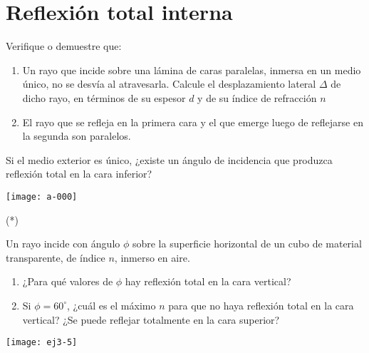 \section*{Reflexión total interna}

\item Verifique o demuestre que:\\
\begin{minipage}[t][4.5cm]{0.65\textwidth}
\begin{enumerate}
	\item Un rayo que incide sobre una lámina de caras paralelas, inmersa en un medio único, no se desvía al atravesarla.
	Calcule el desplazamiento lateral \(\Delta\) de dicho rayo, en términos de su espesor \(d\) y de su índice de refracción \(n\)
	\item El rayo que se refleja en la primera cara y el que emerge luego de reflejarse en la segunda son paralelos.
\end{enumerate}
Si el medio exterior es único, ¿existe un ángulo de incidencia que produzca reflexión total en la cara inferior?
\end{minipage}
\begin{minipage}[c][0cm][t]{0.33\textwidth}
	\texttt{[image: a-000]}
\end{minipage}




\item (*)
\begin{minipage}[t][3.5cm]{0.75\textwidth}
Un rayo incide con ángulo $\phi$ sobre la superficie horizontal de un cubo de material transparente, de índice $n$, inmerso en aire.
\begin{enumerate}
	\item ¿Para qué valores de $\phi$ hay reflexión total en la cara vertical?
	\item Si $\phi=60^{\circ}$, ¿cuál es el máximo $n$ para que no haya reflexión total en la cara vertical?
	¿Se puede reflejar totalmente en la cara superior?
\end{enumerate}
\end{minipage}
\begin{minipage}[c][1.5cm][t]{0.15\textwidth}
	\texttt{[image: ej3-5]}
\end{minipage}



